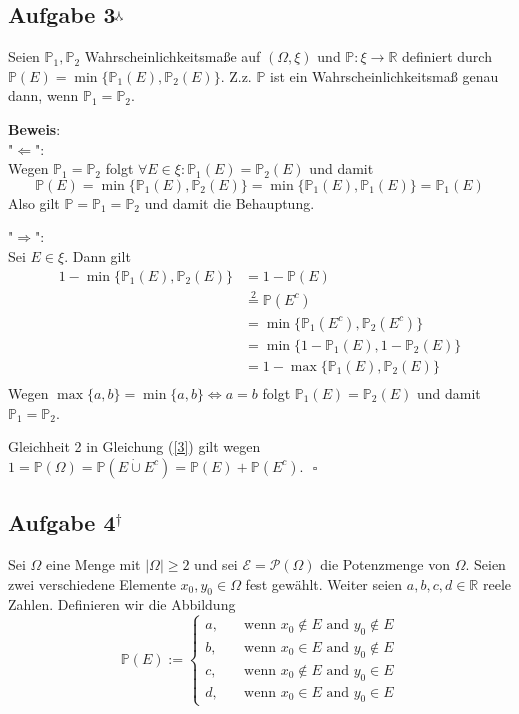 \documentclass[11pt,a4paper,ngerman]{article}
\newcommand{\set}[1]{ \{ #1 \}}
\newcommand{\Prob}{\mathbb{P}}
\begin{document}
\subsection*{Aufgabe 3$^\curlywedgedownarrow$}
Seien $\Prob_1, \Prob_2$ Wahrscheinlichkeitsmaße auf $(\Omega, \xi)$ und $\Prob: \xi \to \mathbb{R}$ definiert durch $\Prob(E) = \min \set{\Prob_1(E), \Prob_2(E)}$. Z.z. $\Prob$ ist ein Wahrscheinlichkeitsmaß genau dann, wenn $\Prob_1 = \Prob_2$.

\textbf{Beweis}: \\
"$\Leftarrow$": \\
Wegen $\Prob_1 = \Prob_2$ folgt $\forall E \in \xi: \Prob_1(E) = \Prob_2(E)$ und damit
\begin{equation}
\Prob(E) = \min \set{\Prob_1(E), \Prob_2(E)} = \min \set{\Prob_1(E), \Prob_1(E)} = \Prob_1(E)
\end{equation}
Also gilt $\Prob = \Prob_1 = \Prob_2$ und damit die Behauptung.

"$\Rightarrow$": \\
Sei $E \in \xi$. Dann gilt
\begin{equation}\label{3}\begin{split}
1-\min \set{\Prob_1(E),\Prob_2(E)}
&= 1- \Prob(E) \\
&\stackrel{2}{=} \Prob(E^c)\\
&= \min \set{\Prob_1(E^c),\Prob_2(E^c)} \\
&= \min \set{1-\Prob_1(E),1-\Prob_2(E)} \\
&= 1- \max \set{\Prob_1(E),\Prob_2(E)} \\
\end{split}\end{equation}
Wegen $\max \set{a,b} = \min \set{a,b} \Leftrightarrow a = b$ folgt
$\Prob_1(E) = \Prob_2(E)$ und damit $\Prob_1 = \Prob_2$.

Gleichheit 2 in Gleichung (\ref{3}) gilt wegen $1 = \Prob(\Omega) = \Prob(E \dot{\cup} E^c) = \Prob(E) + \Prob(E^c)$.
$\mbox{}$ \hfill $\square$
\subsection*{Aufgabe 4$^\dagger$}

Sei $\Omega$ eine Menge mit $\left| \Omega \right| \geq 2$ und sei $\mathcal{E} = \mathcal{P}\left( \Omega \right)$ die Potenzmenge von $\Omega$. Seien
zwei verschiedene Elemente $x_0, y_0 \in \Omega$ fest gewählt. Weiter seien $a,b,c,d \in \mathbb{R}$ reele Zahlen. Definieren wir die Abbildung
$$
    \mathbb{P}(E) := \left\{ \begin{array}{lr} 
        a, &\quad \text{wenn } x_0 \not\in E \text{ and } y_0 \not\in E\\
        b, &\quad \text{wenn } x_0 \in E \text{ and } y_0 \not\in E\\
        c, &\quad \text{wenn } x_0 \not\in E \text{ and } y_0 \in E\\
        d, &\quad \text{wenn } x_0 \in E \text{ and } y_0 \in E
    \end{array}\right.
$$
\end{document}
